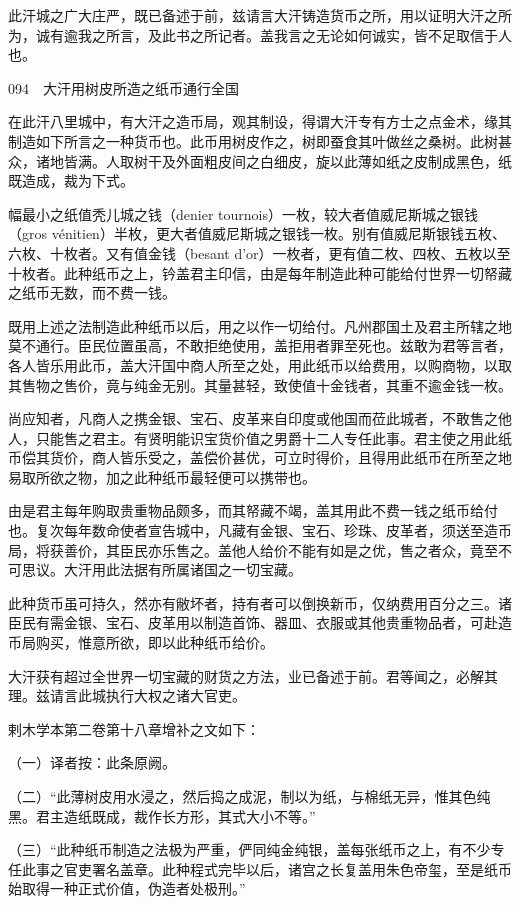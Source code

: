 \documentclass[12pt,UTF8]{ctexbook}
\begin{document}
此汗城之广大庄严，既已备述于前，兹请言大汗铸造货币之所，用以证明大汗之所为，诚有逾我之所言，及此书之所记者。盖我言之无论如何诚实，皆不足取信于人也。





094　大汗用树皮所造之纸币通行全国

在此汗八里城中，有大汗之造币局，观其制设，得谓大汗专有方士之点金术，缘其制造如下所言之一种货币也。此币用树皮作之，树即蚕食其叶做丝之桑树。此树甚众，诸地皆满。人取树干及外面粗皮间之白细皮，旋以此薄如纸之皮制成黑色，纸既造成，裁为下式。

幅最小之纸值秃儿城之钱（denier tournois）一枚，较大者值威尼斯城之银钱（gros vénitien）半枚，更大者值威尼斯城之银钱一枚。别有值威尼斯银钱五枚、六枚、十枚者。又有值金钱（besant d’or）一枚者，更有值二枚、四枚、五枚以至十枚者。此种纸币之上，钤盖君主印信，由是每年制造此种可能给付世界一切帑藏之纸币无数，而不费一钱。

既用上述之法制造此种纸币以后，用之以作一切给付。凡州郡国土及君主所辖之地莫不通行。臣民位置虽高，不敢拒绝使用，盖拒用者罪至死也。兹敢为君等言者，各人皆乐用此币，盖大汗国中商人所至之处，用此纸币以给费用，以购商物，以取其售物之售价，竟与纯金无别。其量甚轻，致使值十金钱者，其重不逾金钱一枚。

尚应知者，凡商人之携金银、宝石、皮革来自印度或他国而莅此城者，不敢售之他人，只能售之君主。有贤明能识宝货价值之男爵十二人专任此事。君主使之用此纸币偿其货价，商人皆乐受之，盖偿价甚优，可立时得价，且得用此纸币在所至之地易取所欲之物，加之此种纸币最轻便可以携带也。

由是君主每年购取贵重物品颇多，而其帑藏不竭，盖其用此不费一钱之纸币给付也。复次每年数命使者宣告城中，凡藏有金银、宝石、珍珠、皮革者，须送至造币局，将获善价，其臣民亦乐售之。盖他人给价不能有如是之优，售之者众，竟至不可思议。大汗用此法据有所属诸国之一切宝藏。

此种货币虽可持久，然亦有敝坏者，持有者可以倒换新币，仅纳费用百分之三。诸臣民有需金银、宝石、皮革用以制造首饰、器皿、衣服或其他贵重物品者，可赴造币局购买，惟意所欲，即以此种纸币给价。

大汗获有超过全世界一切宝藏的财货之方法，业已备述于前。君等闻之，必解其理。兹请言此城执行大权之诸大官吏。

剌木学本第二卷第十八章增补之文如下：

（一）译者按：此条原阙。

（二）“此薄树皮用水浸之，然后捣之成泥，制以为纸，与棉纸无异，惟其色纯黑。君主造纸既成，裁作长方形，其式大小不等。”

（三）“此种纸币制造之法极为严重，俨同纯金纯银，盖每张纸币之上，有不少专任此事之官吏署名盖章。此种程式完毕以后，诸宫之长复盖用朱色帝玺，至是纸币始取得一种正式价值，伪造者处极刑。”
\end{document}
